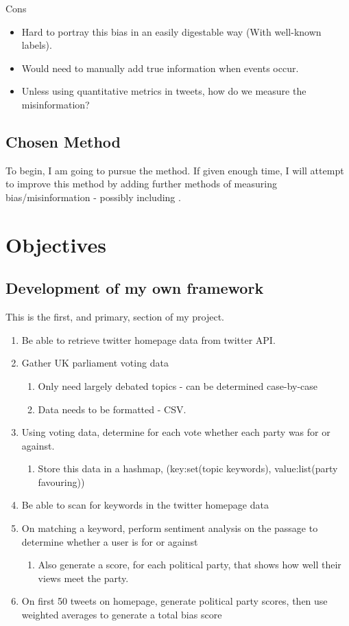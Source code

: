 \documentclass[a4paper,fleqn,10pt]{article}
\begin{document}
Cons
\begin{itemize}
    \item Hard to portray this bias in an easily digestable way (With well-known labels).
    \item Would need to manually add true information when events occur.
    \item Unless using quantitative metrics in tweets, how do we measure the misinformation?
\end{itemize}

\subsection{Chosen Method}
To begin, I am going to pursue the  method. If given enough time, I will attempt to improve
this method by adding further methods of measuring bias/misinformation - possibly including .

\newpage
\section{Objectives}
\label{sec:objectives}
\subsection{Development of my own framework}
This is the first, and primary, section of my project.
\begin{enumerate}
    \item Be able to retrieve twitter homepage data from twitter API.
    \item Gather UK parliament voting data
    \begin{enumerate}
        \item Only need largely debated topics - can be determined case-by-case
        \item Data needs to be formatted - CSV.
    \end{enumerate}
    \item Using voting data, determine for each vote whether each party was for or against.
    \begin{enumerate}
        \item Store this data in a hashmap, (key:set(topic keywords), value:list(party favouring))
    \end{enumerate}
    \item Be able to scan for keywords in the twitter homepage data
    \item On matching a keyword, perform sentiment analysis on the passage to determine whether a user is for or against
    \begin{enumerate}
        \item Also generate a score, for each political party, that shows how well their views meet the party.
    \end{enumerate}
    \item On first 50 tweets on homepage, generate political party scores, then use weighted averages to generate a total bias score
\end{enumerate}
\end{document}
